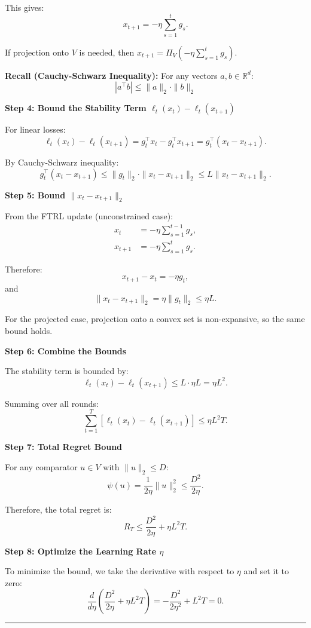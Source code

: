 \documentclass[12pt,letterpaper]{article}
\newenvironment{proof}{\noindent{\bf Proof:}}{\qed\bigskip}
\newcommand{\qed}{\rule{7pt}{7pt}}
\begin{document}
\begin{enumerate}
\begin{proof}
This gives:
\[
x_{t+1} = -\eta \sum_{s=1}^{t} g_s.
\]

If projection onto $V$ is needed, then $x_{t+1} = \Pi_V\left(-\eta \sum_{s=1}^{t} g_s\right)$.

\bigskip

\textbf{Recall (Cauchy-Schwarz Inequality):} For any vectors $a, b \in \mathbb{R}^d$:
$$|a^\top b| \leq \|a\|_2 \cdot \|b\|_2$$

\textbf{Step 4: Bound the Stability Term $\ell_t(x_t) - \ell_t(x_{t+1})$}

For linear losses:
\[
\ell_t(x_t) - \ell_t(x_{t+1}) = g_t^\top x_t - g_t^\top x_{t+1} = g_t^\top(x_t - x_{t+1}).
\]

By Cauchy-Schwarz inequality:
\[
g_t^\top(x_t - x_{t+1}) \leq \|g_t\|_2 \cdot \|x_t - x_{t+1}\|_2 \leq L\|x_t - x_{t+1}\|_2.
\]

\bigskip

\textbf{Step 5: Bound $\|x_t - x_{t+1}\|_2$}

From the FTRL update (unconstrained case):
\begin{align*}
x_t &= -\eta\sum_{s=1}^{t-1}g_s, \\
x_{t+1} &= -\eta\sum_{s=1}^{t}g_s.
\end{align*}

Therefore:
\[
x_{t+1} - x_t = -\eta g_t,
\]
and
\[
\|x_t - x_{t+1}\|_2 = \eta\|g_t\|_2 \leq \eta L.
\]

For the projected case, projection onto a convex set is non-expansive, so the same bound holds.

\bigskip

\textbf{Step 6: Combine the Bounds}

The stability term is bounded by:
\[
\ell_t(x_t) - \ell_t(x_{t+1}) \leq L \cdot \eta L = \eta L^2.
\]

Summing over all rounds:
\[
\sum_{t=1}^{T}\left[\ell_t(x_t) - \ell_t(x_{t+1})\right] \leq \eta L^2 T.
\]

\bigskip

\textbf{Step 7: Total Regret Bound}

For any comparator $u \in V$ with $\|u\|_2 \leq D$:
\[
\psi(u) = \frac{1}{2\eta}\|u\|_2^2 \leq \frac{D^2}{2\eta}.
\]

Therefore, the total regret is:
\[
R_T \leq \frac{D^2}{2\eta} + \eta L^2 T.
\]

\bigskip

\textbf{Step 8: Optimize the Learning Rate $\eta$}

To minimize the bound, we take the derivative with respect to $\eta$ and set it to zero:
\[
\frac{d}{d\eta}\left(\frac{D^2}{2\eta} + \eta L^2 T\right) = -\frac{D^2}{2\eta^2} + L^2 T = 0.
\]


\end{proof}
\end{enumerate}
\end{document}
